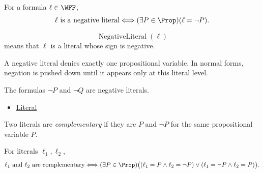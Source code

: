 \begin{remark*}
For a formula \(\ell\in\WFF\),
\[
\ell\text{ is a negative literal}
\Longleftrightarrow
(\exists P\in\Prop)(\ell=\neg P).
\]
\end{remark*}

\begin{remark*}
\[
\operatorname{NegativeLiteral}(\ell)
\]
means that \(\ell\) is a literal whose sign is negative.
\end{remark*}

\begin{remark*}[Interpretation]
A negative literal denies exactly one propositional variable. In normal forms,
negation is pushed down until it appears only at this literal level.
\end{remark*}

\begin{remark*}[Examples]
The formulas \(\neg P\) and \(\neg Q\) are negative literals.
\end{remark*}

\begin{dependencies}
\begin{itemize}
  \item \hyperref[def:literal-propositional-logic]{Literal}
\end{itemize}
\end{dependencies}

\begin{tcolorbox}[colback=propbox, colframe=propborder, arc=2pt,
  left=6pt, right=6pt, top=4pt, bottom=4pt,
  title={\small\textbf{Definition (Complementary Literals)}},
  fonttitle=\small\bfseries]
\begin{definition}
\label{def:complementary-literals-propositional-logic}
Two literals are \emph{complementary} if they are \(P\) and \(\neg P\) for the
same propositional variable \(P\).
\end{definition}
\end{tcolorbox}

\begin{remark*}
For literals \(\ell_1,\ell_2\),
\[
\ell_1\text{ and }\ell_2\text{ are complementary}
\Longleftrightarrow
(\exists P\in\Prop)
\bigl((\ell_1=P\land \ell_2=\neg P)
\lor
(\ell_1=\neg P\land \ell_2=P)\bigr).
\]
\end{remark*}

